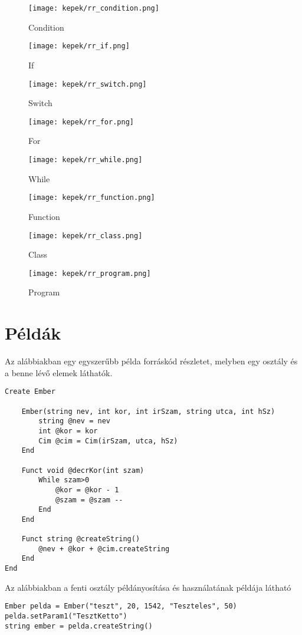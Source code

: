 \begin{figure}[h!]
\centering
\texttt{[image: kepek/rr\_condition.png]}
\caption{Condition}
\label{fig:rr_condition}
\end{figure}

\begin{figure}[h!]
\centering
\texttt{[image: kepek/rr\_if.png]}
\caption{If}
\label{fig:rr_if}
\end{figure}

\begin{figure}[h!]
\centering
\texttt{[image: kepek/rr\_switch.png]}
\caption{Switch}
\label{fig:rr_switch}
\end{figure}

\begin{figure}[h!]
\centering
\texttt{[image: kepek/rr\_for.png]}
\caption{For}
\label{fig:rr_for}
\end{figure}

\begin{figure}[h!]
\centering
\texttt{[image: kepek/rr\_while.png]}
\caption{While}
\label{fig:rr_while}
\end{figure}

\begin{figure}[h!]
\centering
\texttt{[image: kepek/rr\_function.png]}
\caption{Function}
\label{fig:rr_function}
\end{figure}

\begin{figure}[h!]
\centering
\texttt{[image: kepek/rr\_class.png]}
\caption{Class}
\label{fig:rr_class}
\end{figure}

\begin{figure}[h!]
\centering
\texttt{[image: kepek/rr\_program.png]}
\caption{Program}
\label{fig:rr_program}
\end{figure}

\section{Példák}

Az alábbiakban egy egyszerűbb példa forráskód részletet, melyben egy osztály és a benne lévő elemek láthatók.

\begin{verbatim}
Create Ember
	
	Ember(string nev, int kor, int irSzam, string utca, int hSz)
		string @nev = nev
		int @kor = kor
		Cim @cim = Cim(irSzam, utca, hSz)
	End
		
	Funct void @decrKor(int szam)
		While szam>0
			@kor = @kor - 1
			@szam = @szam --
		End
	End
	
	Funct string @createString()
		@nev + @kor + @cim.createString
	End
End
\end{verbatim}
		
Az alábbiakban a fenti osztály példányosítása és használatának példája látható

\begin{verbatim}
Ember pelda = Ember("teszt", 20, 1542, "Teszteles", 50)
pelda.setParam1("TesztKetto")
string ember = pelda.createString()
\end{verbatim}

